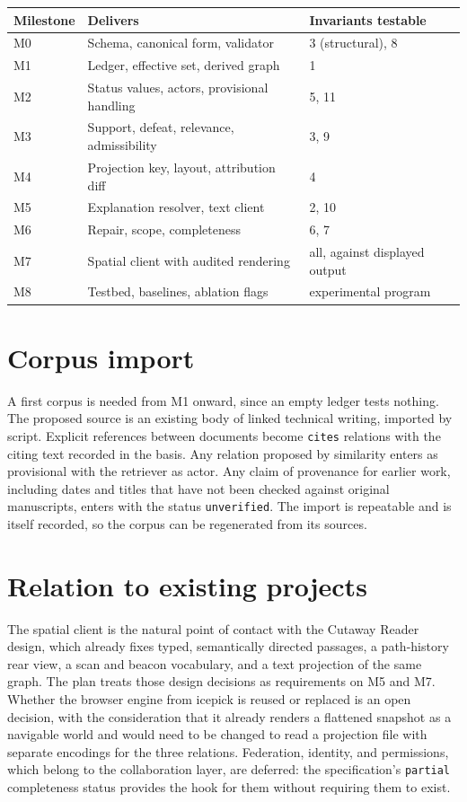 \documentclass[11pt]{article}
\newcommand{\ev}[1]{\texttt{#1}}
\begin{document}
\begin{table}[h]
\centering
\small
\begin{tabular}{@{}p{1.7cm}p{6.9cm}p{4.0cm}@{}}
\toprule
Milestone & Delivers & Invariants testable\\
\midrule
M0 & Schema, canonical form, validator & 3 (structural), 8\\
M1 & Ledger, effective set, derived graph & 1\\
M2 & Status values, actors, provisional handling & 5, 11\\
M3 & Support, defeat, relevance, admissibility & 3, 9\\
M4 & Projection key, layout, attribution diff & 4\\
M5 & Explanation resolver, text client & 2, 10\\
M6 & Repair, scope, completeness & 6, 7\\
M7 & Spatial client with audited rendering & all, against displayed output\\
M8 & Testbed, baselines, ablation flags & experimental program\\
\bottomrule
\end{tabular}
\end{table}

\section{Corpus import}

A first corpus is needed from M1 onward, since an empty ledger tests nothing. The proposed source is an existing body of linked technical writing, imported by script. Explicit references between documents become \ev{cites} relations with the citing text recorded in the basis. Any relation proposed by similarity enters as provisional with the retriever as actor. Any claim of provenance for earlier work, including dates and titles that have not been checked against original manuscripts, enters with the status \ev{unverified}. The import is repeatable and is itself recorded, so the corpus can be regenerated from its sources.

\section{Relation to existing projects}

The spatial client is the natural point of contact with the Cutaway Reader design, which already fixes typed, semantically directed passages, a path-history rear view, a scan and beacon vocabulary, and a text projection of the same graph. The plan treats those design decisions as requirements on M5 and M7. Whether the browser engine from icepick is reused or replaced is an open decision, with the consideration that it already renders a flattened snapshot as a navigable world and would need to be changed to read a projection file with separate encodings for the three relations. Federation, identity, and permissions, which belong to the collaboration layer, are deferred: the specification's \ev{partial} completeness status provides the hook for them without requiring them to exist.
\end{document}
